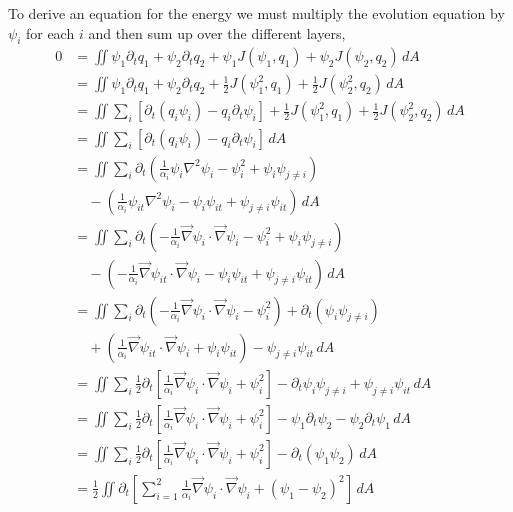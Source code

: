\documentclass[12pt]{article}
\begin{document}
To derive an equation for the energy we must multiply the evolution equation by $\psi_i$ for each $i$ and then sum up over the different layers,
\begin{align*}
0 &= \iint \psi_1 \partial_t q_1 + \psi_2 \partial_t q_2 + \psi_1 J(\psi_1, q_1) + \psi_2 J(\psi_2, q_2) \, dA \\
 &= \iint \psi_1 \partial_t q_1 + \psi_2 \partial_t q_2 + \frac12 J(\psi_1^2, q_1) + \frac12 J(\psi_2^2, q_2) \, dA \\
 &= \iint \sum_i \left[\partial_t(q_i \psi_i) - q_i \partial_t\psi_i \right] + \frac12 J(\psi_1^2, q_1) + \frac12 J(\psi_2^2, q_2) \, dA \\
 &= \iint \sum_i \left[\partial_t(q_i \psi_i) - q_i \partial_t\psi_i \right] \, dA \\
 &= \iint \sum_i \partial_t \left (\frac{1}{\alpha_i}\psi_i \nabla^2 \psi_i - \psi_i^2 + \psi_i\psi_{j\ne i} \right) \\
  &\quad - \left( \frac{1}{\alpha_i} \psi_{it} \nabla^2 \psi_i - \psi_i \psi_{it} + \psi_{j \ne i} \psi_{it} \right) \, dA \\
 &= \iint \sum_i \partial_t \left (-\frac{1}{\alpha_i} \vec\nabla \psi_i \cdot \vec\nabla \psi_i - \psi_i^2 + \psi_i\psi_{j\ne i} \right) \\
  &\quad - \left( -\frac{1}{\alpha_i} \vec\nabla \psi_{it} \cdot \vec\nabla \psi_i - \psi_i \psi_{it} + \psi_{j \ne i} \psi_{it} \right) \, dA \\
 &= \iint \sum_i \partial_t \left (-\frac{1}{\alpha_i} \vec\nabla \psi_i \cdot \vec\nabla \psi_i - \psi_i^2 \right) + \partial_t (\psi_i\psi_{j\ne i})  \\
  &\quad + \left( \frac{1}{\alpha_i} \vec\nabla \psi_{it} \cdot \vec\nabla \psi_i + \psi_i \psi_{it} \right) - \psi_{j \ne i} \psi_{it} \, dA \\
 &= \iint \sum_i \frac12 \partial_t \left[ \frac{1}{\alpha_i} \vec\nabla \psi_i \cdot \vec\nabla \psi_i + \psi_i^2 \right] - \partial_t \psi_i\psi_{j\ne i} + \psi_{j \ne i} \psi_{it} \, dA \\
 &= \iint  \sum_i \frac12 \partial_t \left[ \frac{1}{\alpha_i} \vec\nabla \psi_i \cdot  \vec\nabla \psi_i + \psi_i^2 \right] - \psi_1 \partial_t \psi_2  -  \psi_2 \partial_t \psi_1\, dA \\
 &= \iint  \sum_i \frac12 \partial_t \left[ \frac{1}{\alpha_i} \vec\nabla \psi_i \cdot  \vec\nabla \psi_i + \psi_i^2 \right] -  \partial_t (\psi_1\psi_2)\, dA \\
 &= \frac12 \iint \partial_t \left[ \sum_{i=1}^2 \frac{1}{\alpha_i} \vec\nabla \psi_i \cdot \vec\nabla \psi_i + (\psi_1 - \psi_2)^2 \right]\, dA
\end{align*}
\end{document}
